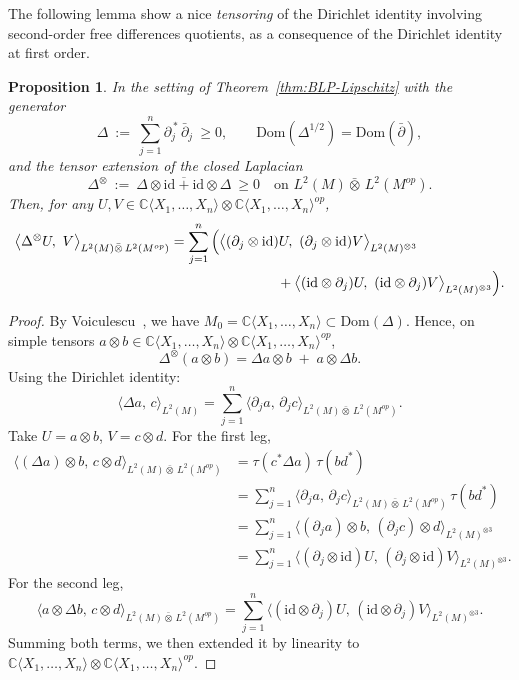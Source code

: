 \documentclass[10pt,a4paper,reqno]{amsart}
\newtheorem{proposition}[theorem]{Proposition}
\newcommand{\A}{\mathbb{C}\langle X_1,\dots,X_n\rangle}
\newcommand{\Dom}{\mathrm{Dom}}
\begin{document}
\begin{flushleft}
    The following lemma show a nice \emph{tensoring} of the Dirichlet identity involving second-order free differences quotients, as a consequence of the Dirichlet identity at first order.
\end{flushleft}
\begin{proposition} \label{prop:tensor-dirichlet-Delta} In the setting of Theorem~\ref{thm:BLP-Lipschitz} with the generator \[ \Delta\ :=\ \sum_{j=1}^n \partial_j^{\,*}\,\bar{\partial}_j\ \ge 0, \qquad \Dom(\Delta^{1/2})=\Dom(\bar{\partial}), \] and the tensor extension of the closed Laplacian \[ \Delta^{\otimes}\ :=\ \overline{\Delta\otimes \mathrm{id}+\mathrm{id}\otimes \Delta}\ \ge 0 \quad\text{on }L^2(M){\bar\otimes}\,L^2(M^{op}). \] Then, for any $U,V\in \A\otimes \A^{op}$, \begin{align*} \big\langle \Delta^{\otimes} U,\ V\big\rangle_{L^2(M){\bar\otimes}\,L^2(M^{op})} &=\sum_{j=1}^n \Big( \big\langle (\partial_j\otimes \mathrm{id})U,\ (\partial_j\otimes \mathrm{id})V\big\rangle_{L^2(M)^{\otimes 3}}\\ &\hspace{2.7cm}+ \big\langle (\mathrm{id}\otimes \partial_j)U,\ (\mathrm{id}\otimes \partial_j)V\big\rangle_{L^2(M)^{\otimes 3}} \Big). \end{align*} \end{proposition} \begin{proof} By Voiculescu~\cite[Proposition~4.4]{V}, we have $M_0=\mathbb C \langle X_1,\ldots,X_n\rangle \subset \Dom(\Delta)$. Hence, on simple tensors $a\otimes b\in\A\otimes \A^{op}$, \[ \Delta^{\otimes}(a\otimes b)=\Delta a\otimes b\;+\;a\otimes \Delta b. \] Using the Dirichlet identity: \[ \langle \Delta a,\,c\rangle_{L^2(M)}=\sum_{j=1}^n \big\langle \partial_j a,\,\partial_j c\big\rangle_{L^2(M){\bar\otimes}\,L^2(M^{op})}. \] Take $U=a\otimes b$, $V=c\otimes d$. For the first leg, \begin{align*} \big\langle (\Delta a)\otimes b,\,c\otimes d\big\rangle_{L^2(M){\bar\otimes}\, L^2(M^{op})} &=\tau(c^\ast \Delta a)\,\tau(b d^\ast)\\ &=\sum_{j=1}^n \big\langle \partial_j a,\,\partial_j c\big\rangle_{L^2(M){\bar\otimes}\,L^2(M^{op})}\,\tau(b d^\ast)\\ &=\sum_{j=1}^n \big\langle (\partial_j a)\otimes b,\,(\partial_j c)\otimes d\big\rangle_{L^2(M)^{\otimes 3}}\\ &=\sum_{j=1}^n \big\langle (\partial_j\otimes \mathrm{id})U,\,(\partial_j\otimes \mathrm{id})V\big\rangle_{L^2(M)^{\otimes 3}}. \end{align*} For the second leg, \[ \big\langle a\otimes \Delta b,\,c\otimes d\big\rangle_{L^2(M){\bar\otimes}\, L^2(M^{op})} =\sum_{j=1}^n \big\langle (\mathrm{id}\otimes \partial_j)U,\,(\mathrm{id}\otimes \partial_j)V\big\rangle_{L^2(M)^{\otimes 3}}. \] Summing both terms, we then extended it by linearity to $\A\otimes \A^{op}$. \end{proof}
\end{document}

